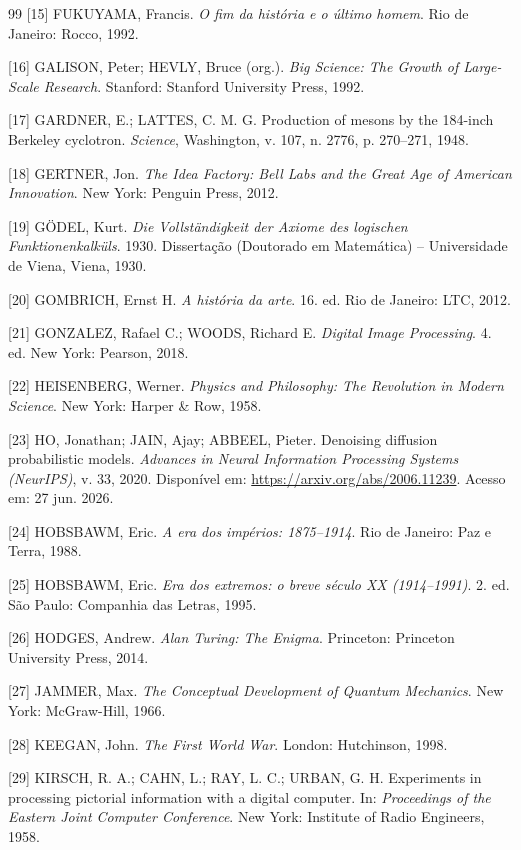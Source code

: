 \documentclass{hipatia}
\begin{document}
{\begin{thebibliography}{99}
[15]
FUKUYAMA, Francis.
\textit{O fim da história e o último homem}.
Rio de Janeiro: Rocco, 1992.

[16]
GALISON, Peter; HEVLY, Bruce (org.).
\textit{Big Science: The Growth of Large-Scale Research}.
Stanford: Stanford University Press, 1992.

[17]
GARDNER, E.; LATTES, C. M. G.
Production of mesons by the 184-inch Berkeley cyclotron.
\textit{Science},
Washington,
v. 107,
n. 2776,
p. 270--271,
1948.

[18]
GERTNER, Jon.
\textit{The Idea Factory: Bell Labs and the Great Age of American Innovation}.
New York: Penguin Press, 2012.

[19]
GÖDEL, Kurt.
\textit{Die Vollständigkeit der Axiome des logischen Funktionenkalküls}.
1930.
Dissertação (Doutorado em Matemática) --
Universidade de Viena,
Viena,
1930.

[20]
GOMBRICH, Ernst H.
\textit{A história da arte}.
16. ed.
Rio de Janeiro: LTC, 2012.

[21]
GONZALEZ, Rafael C.; WOODS, Richard E.
\textit{Digital Image Processing}.
4. ed.
New York: Pearson, 2018.

[22]
HEISENBERG, Werner.
\textit{Physics and Philosophy: The Revolution in Modern Science}.
New York: Harper \& Row, 1958.

[23]
HO, Jonathan; JAIN, Ajay; ABBEEL, Pieter.
Denoising diffusion probabilistic models.
\textit{Advances in Neural Information Processing Systems (NeurIPS)},
v. 33, 2020.
Disponível em:
\url{https://arxiv.org/abs/2006.11239}.
Acesso em: 27 jun. 2026.

[24]
HOBSBAWM, Eric.
\textit{A era dos impérios: 1875--1914}.
Rio de Janeiro: Paz e Terra, 1988.

[25]
HOBSBAWM, Eric.
\textit{Era dos extremos: o breve século XX (1914--1991)}.
2. ed.
São Paulo: Companhia das Letras, 1995.

[26]
HODGES, Andrew.
\textit{Alan Turing: The Enigma}.
Princeton: Princeton University Press, 2014.

[27]
JAMMER, Max.
\textit{The Conceptual Development of Quantum Mechanics}.
New York: McGraw-Hill, 1966.

[28]
KEEGAN, John.
\textit{The First World War}.
London: Hutchinson, 1998.

[29]
KIRSCH, R. A.; CAHN, L.; RAY, L. C.; URBAN, G. H.
Experiments in processing pictorial information with a digital computer.
In: \textit{Proceedings of the Eastern Joint Computer Conference}.
New York: Institute of Radio Engineers, 1958.


\end{thebibliography}}
\end{document}
